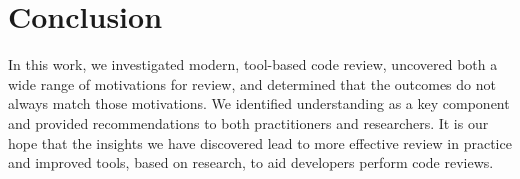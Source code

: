 
\section{Conclusion} \label{sec:conclusion}


In this work, we investigated modern, tool-based code review, uncovered both a wide range of motivations for review, and determined that the outcomes do not always match those motivations. We identified understanding as a key component and provided recommendations to both practitioners and researchers. It is our hope that the insights we have discovered lead to more effective review in practice and improved tools, based on research, to aid developers perform code reviews.